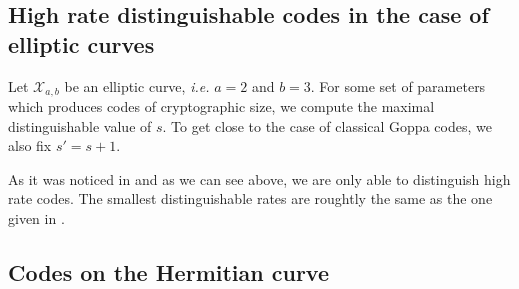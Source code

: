 \documentclass[lettersize,journal]{IEEEtran}
\theoremstyle{plain}
\theoremstyle{definition}
\theoremstyle{remark}
\newcommand{\calX}{\mathcal{X}}
\begin{document}
	\subsection{High rate distinguishable codes in the case of elliptic curves}
	
	Let $\calX_{a,b}$ be an elliptic curve, \emph{i.e.} $a=2$ and $b=3$. For some set of parameters which produces codes of cryptographic size, we compute the maximal distinguishable value of $s$. To get close to the case of classical Goppa codes, we also fix $s'=s+1$.
	\begin{table}[h]
		\begin{center}
			\caption{Largest distinguishable Goppa--like AG code in elliptic case.}
		\end{center}
	\end{table}
	
	As it was noticed in \cite{MT21} and as we can see above, we are only able to distinguish high rate codes. The smallest distinguishable rates are roughtly the same as the one given in \cite{MT21}. 
	
	\subsection{Codes on the Hermitian curve}
	
\end{document}
